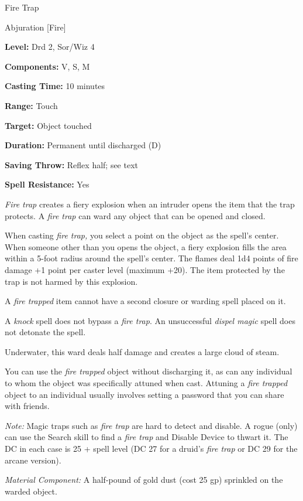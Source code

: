 \documentclass{article}
\begin{document}
\vspace{12pt}
Fire Trap

Abjuration [Fire]

\textbf{Level:} Drd 2, Sor/Wiz 4

\textbf{Components:} V, S, M

\textbf{Casting Time:} 10 minutes

\textbf{Range:} Touch

\textbf{Target:} Object touched

\textbf{Duration:} Permanent until discharged (D)

\textbf{Saving Throw:} Reflex half; see text

\textbf{Spell Resistance:} Yes

\textit{Fire trap }creates a fiery explosion when an intruder opens the item that 
the trap protects. A \textit{fire trap }can ward any object that can be opened 
and closed.

When casting \textit{fire trap, }you select a point on the object as the spell's 
center. When someone other than you opens the object, a fiery explosion fills the 
area within a 5-foot radius around the spell's center. The flames deal 1d4 points 
of fire damage +1 point per caster level (maximum +20). The item protected by the 
trap is not harmed by this explosion.

A \textit{fire trapped }item cannot have a second closure or warding spell placed 
on it.

A \textit{knock }spell does not bypass a \textit{fire trap}.  An unsuccessful \textit{dispel 
magic }spell does not detonate the spell.

Underwater, this ward deals half damage and creates a large cloud of steam.

You can use the \textit{fire trapped }object without discharging it, as can any 
individual to whom the object was specifically attuned when cast. Attuning a \textit{fire 
trapped }object to an individual usually involves setting a password that you can 
share with friends.

\textit{Note: }Magic traps such as \textit{fire trap }are hard to detect and disable. 
A rogue (only) can use the Search skill to find a \textit{fire trap }and Disable 
Device to thwart it. The DC in each case is 25 + spell level (DC 27 for a druid's 
\textit{fire trap }or DC 29 for the arcane version).

\textit{Material Component: }A half-pound of gold dust (cost 25 gp) sprinkled on 
the warded object.
\end{document}
